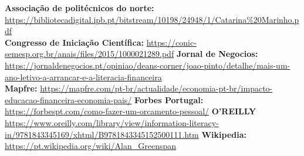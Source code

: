 \documentclass[a4paper,11pt]{report}
\begin{document}




	\begin{thebibliography}{99}
			\textbf{Associação de politécnicos do norte:}
				\url{https://bibliotecadigital.ipb.pt/bitstream/10198/24948/1/Catarina%20Marinho.pdf} \\
			\textbf{Congresso de Iniciação Científica:}
				\url{https://conic-semesp.org.br/anais/files/2015/1000021289.pdf}
			\textbf{Jornal de Negocios:}
				\url{https://jornaldenegocios.pt/opiniao/deans-corner/joao-pinto/detalhe/mais-um-ano-letivo-a-arrancar-e-a-literacia-financeira} \\
			\textbf{Mapfre:}
				\url{https://mapfre.com/pt-br/actualidade/economia-pt-br/impacto-educacao-financeira-economia-pais/}
			\textbf{Forbes Portugal:}
				\url{https://forbespt.com/como-fazer-um-orcamento-pessoal/}
			\textbf{O'REILLY}
				\url{https://www.oreilly.com/library/view/information-literacy-in/9781843345169/xhtml/B9781843345152500111.htm}
			\textbf{Wikipedia:} \url{https://pt.wikipedia.org/wiki/Alan_Greenspan}
	\end{thebibliography}
\end{document}
